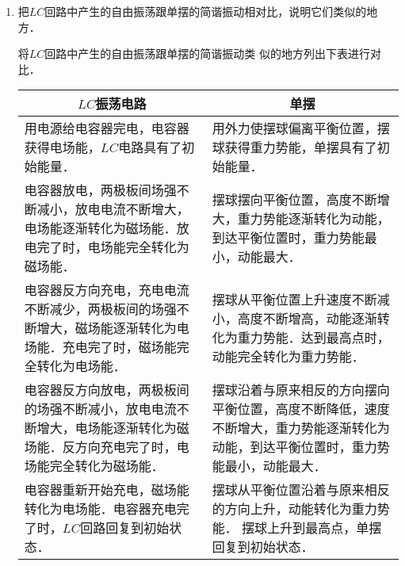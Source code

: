 \begin{enumerate}
	\item 把$LC$回路中产生的自由振荡跟单摆的简谐振动相对比，说明它们类似的地方．

    \begin{solution}
将$LC$回路中产生的自由振荡跟单摆的简谐振动类
似的地方列出下表进行对比．
\begin{center}
\begin{tabular}{p{}p{}}
\hline

\multicolumn{1}{c}{$LC$振荡电路}& \multicolumn{1}{c}{单摆}\\
\hline
用电源给电容器完电，电容器获得电场能，$LC$电路具有了初始能量．
 &用外力使摆球偏离平衡位置，摆球获得重力势能，单摆具有了初始能量．\\\hline
 电容器放电，两极板间场强不断减小，放电电流不断增大，电场能逐渐转化为磁场能．放电完了时，电场能完全转化为磁场能．
&摆球摆向平衡位置，高度不断增大，重力势能逐渐转化为动能，到达平衡位置时，重力势能最小，动能最大．\\\hline
电容器反方向充电，充电电流不断减少，两极板间的场强不断增大，磁场能逐渐转化为电场能．充电完了时，磁场能完全转化为电场能．
&摆球从平衡位置上升速度不断减小，高度不断增高，动能逐渐转化为重力势能．达到最高点时，动能完全转化为重力势能．\\\hline
电容器反方向放电，两极板间的场强不断减小，放电电流不断增大，电场能逐渐转化为磁场能．反方向充电完了时，电场能完全转化为磁场能．
& 摆球沿着与原来相反的方向摆向平衡位置，高度不断降低，速度不断增大，重力势能逐渐转化为动能，到达平衡位置时，重力势能最小，动能最大．\\\hline
电容器重新开始充电，磁场能转化为电场能．电容器充电完了时，$LC$回路回复到初始状态．
&摆球从平衡位置沿着与原来相反的方向上升，动能转化为重力势能．
摆球上升到最高点，单摆回复到初始状态．\\
\hline
\end{tabular}
\end{center}
    \end{solution}
\end{enumerate}



